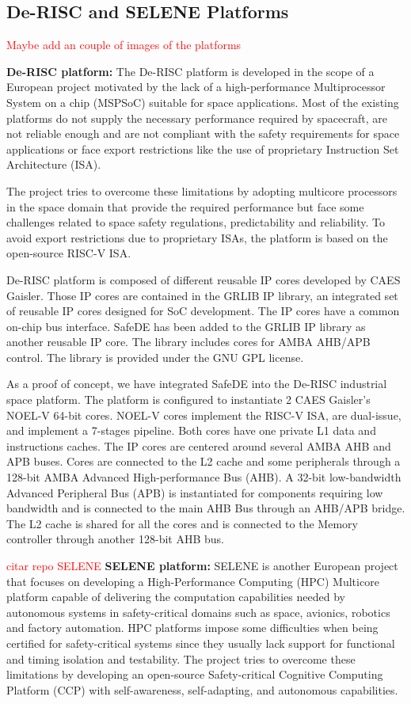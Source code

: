 \subsection{De-RISC and SELENE Platforms}
\textcolor{red}{Maybe add an couple of images of the platforms}


\textbf{De-RISC platform:} The De-RISC platform \cite{gomez2020risc} is developed in the scope of a European project motivated by the lack of a high-performance Multiprocessor System on a chip (MSPSoC) suitable for space applications. Most of the existing platforms do not supply the necessary performance required by spacecraft, are not reliable enough and are not compliant with the safety requirements for space applications or face export restrictions like the use of proprietary Instruction Set Architecture (ISA). 

The project tries to overcome these limitations by adopting multicore processors in the space domain that provide the required performance but face some challenges related to space safety regulations, predictability and reliability. To avoid export restrictions due to proprietary ISAs, the platform is based on the open-source RISC-V ISA. 

De-RISC platform is composed of different reusable IP cores developed by CAES Gaisler. Those IP cores are contained in the GRLIB IP library, an integrated set of reusable IP cores designed for SoC development. The IP cores have a common on-chip bus interface. SafeDE has been added to the GRLIB IP library as another reusable IP core. The library includes cores for AMBA AHB/APB control. The library is provided under the GNU GPL license.

As a proof of concept, we have integrated SafeDE into the De-RISC industrial space platform. The platform is configured to instantiate 2 CAES Gaisler's NOEL-V 64-bit cores. NOEL-V cores implement the RISC-V ISA, are dual-issue, and implement a 7-stages pipeline. Both cores have one private L1 data and instructions caches. The IP cores are centered around several AMBA AHB and APB buses. Cores are connected to the L2 cache and some peripherals through a 128-bit AMBA Advanced High-performance Bus (AHB). A 32-bit low-bandwidth Advanced Peripheral Bus (APB) is instantiated for components requiring low bandwidth and is connected to the main AHB Bus through an AHB/APB bridge. The L2 cache is shared for all the cores and is connected to the Memory controller through another 128-bit AHB bus.


\textcolor{red}{citar repo SELENE}
\textbf{SELENE platform:} SELENE \cite{SELENEgit} is another European project that focuses on developing a High-Performance Computing (HPC) Multicore platform capable of delivering the computation capabilities needed by autonomous systems in safety-critical domains such as space, avionics, robotics and factory automation. HPC platforms impose some difficulties when being certified for safety-critical systems since they usually lack support for functional and timing isolation and testability. The project tries to overcome these limitations by developing an open-source Safety-critical Cognitive Computing Platform (CCP) with self-awareness, self-adapting, and autonomous capabilities. 

